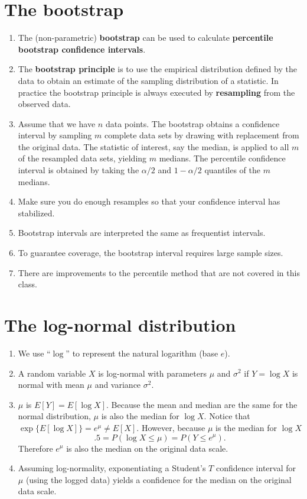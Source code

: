 \documentclass[12pt]{article}
\begin{document}
\section{The bootstrap}
\begin{enumerate}[1.]
\item The (non-parametric) {\bf bootstrap} can be used to calculate
  {\bf percentile bootstrap confidence intervals}.
\item The {\bf bootstrap principle} is to use the empirical distribution
  defined by the data to obtain an estimate of the sampling distribution
  of a statistic. In practice the bootstrap principle is always executed
  by {\bf resampling} from the observed data.
\item Assume that we have $n$ data points. The bootstrap obtains a
  confidence interval by sampling $m$ complete data sets by drawing
  with replacement from the original data. The statistic of interest,
  say the median, is applied to all $m$ of the resampled data sets, yielding
  $m$ medians. The percentile confidence interval is obtained by taking
  the $\alpha / 2$ and $1 - \alpha /2$ quantiles of the $m$ medians.
\item Make sure you do enough resamples so that your confidence interval
  has stabilized.
\item Bootstrap intervals are interpreted the same as frequentist intervals.
\item To guarantee coverage, the bootstrap interval requires large
  sample sizes.
\item There are improvements to the percentile method that are not covered in
  this class.
\end{enumerate}

\section{The log-normal distribution}
\begin{enumerate}[1.]
\item We use ``$\log$'' to represent the natural logarithm (base $e$). 
\item A random variable $X$ is log-normal with parameters $\mu$ and
  $\sigma^2$ if $Y = \log X$ is normal with mean $\mu$ and variance
  $\sigma^2$.
\item $\mu$ is $E[Y] = E[\log X]$. Because the mean and median are
  the same for the normal distribution, $\mu$ is also the median for $\log X$.
  Notice that $\exp\{E[\log X]\} = e^\mu \neq E[X]$. However, because
  $\mu$ is the median for $\log X$
  $$
  .5 = P(\log X \leq \mu) = P(Y \leq e^\mu).
  $$ 
  Therefore $e^\mu$ is also the median on the original data scale.
\item Assuming log-normality, exponentiating a Student's $T$ confidence
  interval for $\mu$ (using the logged data) yields a confidence
  for the median on the original data scale.
\end{enumerate}
\end{document}
